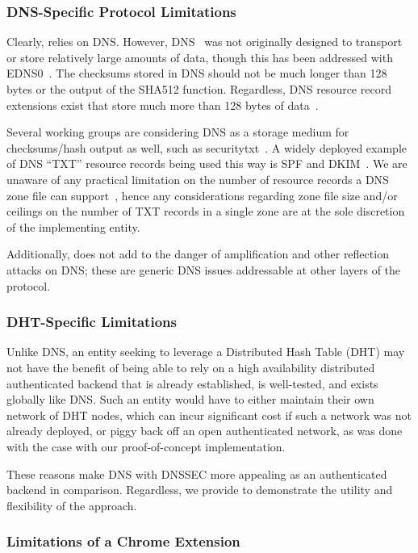 \subsubsection{DNS-Specific Protocol Limitations}

Clearly, \DNSSYS{} relies on DNS. However, DNS~\cite{DNS1} was not originally
designed to transport or store relatively large amounts of data, though this has
been addressed with EDNS0~\cite{EDNS}. The checksums stored in DNS should not be
much longer than 128 bytes or the output of the SHA512 function. Regardless, DNS
resource record extensions exist that store much more than 128 bytes of
data~\cite{CERT, IPSECKEY, DANE3, DANE1}.

Several working groups are considering DNS as a storage medium for
checksums/hash output as well, such as securitytxt~\cite{draft-sectxt}. A widely
deployed example of DNS ``TXT'' resource records being used this way is SPF and
DKIM~\cite{DKIM}. We are unaware of any practical limitation on the number of
resource records a DNS zone file can support~\cite{DNS1}, hence any
considerations regarding zone file size and/or ceilings on the number of TXT
records in a single zone are at the sole discretion of the implementing entity.

Additionally, \DNSSYS{} does not add to the danger of amplification and other
reflection attacks on DNS; these are generic DNS issues addressable at other
layers of the protocol.

\subsubsection{DHT-Specific Limitations}

Unlike DNS, an entity seeking to leverage a Distributed Hash Table (DHT) may not
have the benefit of being able to rely on a high availability distributed
authenticated backend that is already established, is well-tested, and exists
globally like DNS. Such an entity would have to either maintain their own
network of DHT nodes, which can incur significant cost if such a network was not
already deployed, or piggy back off an open authenticated network, as was done
with the case with our proof-of-concept \DHTSYS{} implementation.

These reasons make DNS with DNSSEC more appealing as an authenticated backend in
comparison. Regardless, we provide \DHTSYS{} to demonstrate the utility and
flexibility of the \SYSTEM{} approach.

\subsubsection{Limitations of a Chrome Extension}

